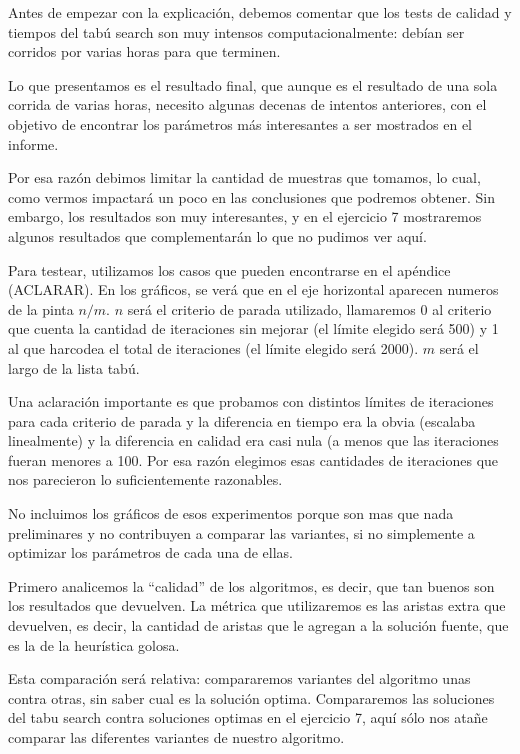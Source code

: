 

Antes de empezar con la explicación, debemos comentar que los tests de calidad y tiempos del tabú search son muy intensos computacionalmente: debían ser corridos por varias horas para que terminen.

Lo que presentamos es el resultado final, que aunque es el resultado de una sola corrida de varias horas, necesito algunas decenas de intentos anteriores, con el objetivo de encontrar los parámetros más interesantes a ser mostrados en el informe.

Por esa razón debimos limitar la cantidad de muestras que tomamos, lo cual, como vermos impactará un poco en las conclusiones que podremos obtener.
Sin embargo, los resultados son muy interesantes, y en el ejercicio 7 mostraremos algunos resultados que complementarán lo que no pudimos ver aquí.




Para testear, utilizamos los casos que pueden encontrarse en el apéndice (ACLARAR). 
En los gráficos, se verá que en el eje horizontal aparecen numeros de la pinta $n/m$.
$n$ será el criterio de parada utilizado, llamaremos 0 al criterio que cuenta la cantidad de iteraciones sin mejorar (el límite elegido será 500) y 1 al que harcodea el total de iteraciones (el límite elegido será 2000).
$m$ será el largo de la lista tabú.


Una aclaración importante es que probamos con distintos límites de iteraciones para cada criterio de parada y la diferencia en tiempo era la obvia (escalaba linealmente) y la diferencia en calidad era casi nula (a menos que las iteraciones fueran menores a 100. Por esa razón elegimos esas cantidades de iteraciones que nos parecieron lo suficientemente razonables.

No incluimos los gráficos de esos experimentos porque son mas que nada preliminares y no contribuyen a comparar las variantes, si no simplemente a optimizar los parámetros de cada una de ellas.



Primero analicemos la ``calidad'' de los algoritmos, es decir, que tan buenos son los resultados que devuelven. La métrica que utilizaremos es las aristas extra que devuelven, es decir, la cantidad de aristas que le agregan a la solución fuente, que es la de la heurística golosa.

Esta comparación será relativa: compararemos variantes del algoritmo unas contra otras, sin saber cual es la solución optima. Compararemos las soluciones del tabu search contra soluciones optimas en el ejercicio 7, aquí sólo nos atañe comparar las diferentes variantes de nuestro algoritmo.

